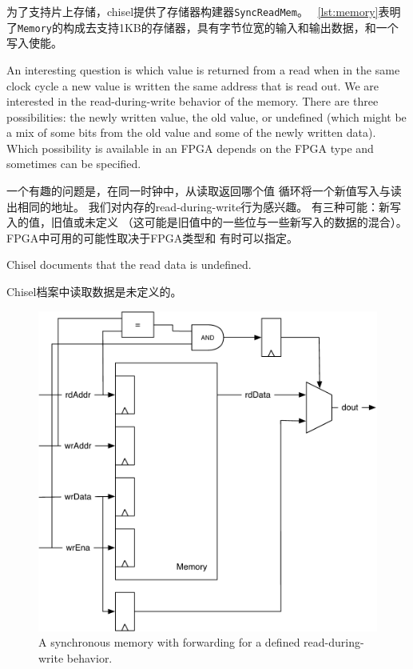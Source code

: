 \documentclass[%
    10pt,
    headinclude, footexclude,
    openright, %
    notitlepage,
    cleardoubleempty,
    headsepline,
    pointlessnumbers,
    bibtotoc, idxtotoc,
    ]{scrbook}
\newcommand{\code}[1]{{\small{\texttt{#1}}}}
\newcommand{\scale}{0.7}
\begin{document}
为了支持片上存储，chisel提供了存储器构建器\code{SyncReadMem}。
~\ref{lst:memory}表明了\code{Memory}的构成去支持1KB的存储器，具有字节位宽的输入和输出数据，和一个写入使能。


An interesting question is which value is returned from a read when in the same clock
cycle a new value is written the same address that is read out.
We are interested in the read-during-write behavior of the memory.
There are three possibilities: the newly written value, the old value, or undefined
(which might be a mix of some bits from the old value and some of the newly written data).
Which possibility is available in an FPGA depends on the FPGA type and
sometimes can be specified.

一个有趣的问题是，在同一时钟中，从读取返回哪个值
循环将一个新值写入与读出相同的地址。
我们对内存的read-during-write行为感兴趣。
有三种可能：新写入的值，旧值或未定义
（这可能是旧值中的一些位与一些新写入的数据的混合）。
FPGA中可用的可能性取决于FPGA类型和
有时可以指定。

Chisel documents that the read data is undefined.

Chisel档案中读取数据是未定义的。

\begin{figure}
  \centering
  \includegraphics[scale=\scale]{figures/memory-forwarding}
  \caption{A synchronous memory with forwarding for a defined read-during-write behavior.}
  \label{fig:memory:forwarding}
\end{figure}
\end{document}
